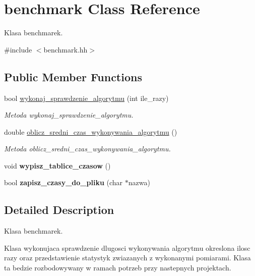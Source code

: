 \hypertarget{classbenchmark}{\section{benchmark Class Reference}
\label{classbenchmark}
}


Klasa benchmarek.  




{\ttfamily \#include $<$benchmark.\+hh$>$}

\subsection*{Public Member Functions}
\begin{DoxyCompactItemize}
\item 
bool \hyperlink{classbenchmark_ab83ffeb122d3cc231acdbf45db4f5ff8}{wykonaj\+\_\+sprawdzenie\+\_\+algorytmu} (int ile\+\_\+razy)
\begin{DoxyCompactList}\small\item\em Metoda wykonaj\+\_\+sprawdzenie\+\_\+algorytmu. \end{DoxyCompactList}\item 
double \hyperlink{classbenchmark_a47af0a6ddc3d1e5afe3324f166ae1292}{oblicz\+\_\+sredni\+\_\+czas\+\_\+wykonywania\+\_\+algorytmu} ()
\begin{DoxyCompactList}\small\item\em Metoda oblicz\+\_\+sredni\+\_\+czas\+\_\+wykonywania\+\_\+algorytmu. \end{DoxyCompactList}\item 
\hypertarget{classbenchmark_ad2fa742abac2df08a8a3174ca0cd2a09}{void {\bfseries wypisz\+\_\+tablice\+\_\+czasow} ()}\label{classbenchmark_ad2fa742abac2df08a8a3174ca0cd2a09}

\item 
\hypertarget{classbenchmark_a452c061a57050dacd3429ad5186b49fe}{bool {\bfseries zapisz\+\_\+czasy\+\_\+do\+\_\+pliku} (char $\ast$nazwa)}\label{classbenchmark_a452c061a57050dacd3429ad5186b49fe}

\end{DoxyCompactItemize}


\subsection{Detailed Description}
Klasa benchmarek. 

Klasa wykonujaca sprawdzenie dlugosci wykonywania algorytmu okreslona ilosc razy oraz przedstawienie statystyk zwiazanych z wykonanymi pomiarami. Klasa ta bedzie rozbodowywany w ramach potrzeb przy nastepnych projektach. 

